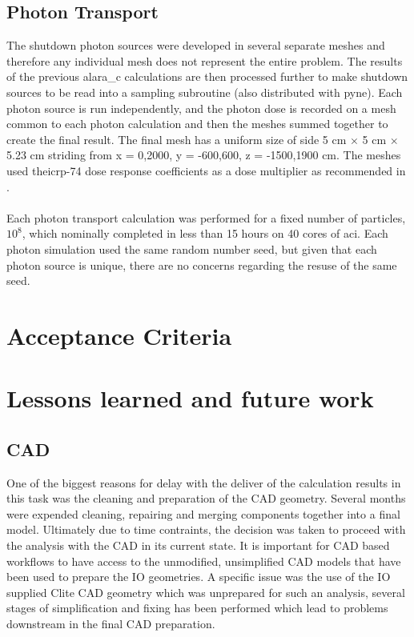 \documentclass[12pt]{article}
\begin{document}
\subsection{Photon Transport}
The shutdown photon sources were developed in several separate meshes and
therefore any individual mesh does not represent the entire problem. The
results of the previous \gls{alara_c} calculations are then processed further
to make shutdown sources to be read into a sampling subroutine (also distributed
with \gls{pyne}). Each photon source is run independently, and the photon dose
is recorded on a mesh common to each photon calculation and then the meshes
summed together to create the final result. The final mesh has a uniform size of
side 5 cm $\times$ 5 cm $\times$ 5.23 cm striding from x = {0,2000}, y = {-600,600},
 z = {-1500,1900} cm. The meshes used the\gls{icrp}-74 dose response coefficients 
as a dose multiplier as recommended in \cite{iter_sdr_coeffs}.
\\
\\
Each photon transport calculation was performed for a fixed number of particles,
$10^8$, which nominally completed in less than 15 hours on 40 cores of
\gls{aci}. Each photon simulation used the same random number seed, but given
that each photon source is unique, there are no concerns regarding the resuse
of the same seed.

\newpage
\clearpage
\section{Acceptance Criteria}

\newpage
\clearpage
\section{Lessons learned and future work}
\subsection*{CAD}
One of the biggest reasons for delay with the deliver of the calculation results
in this task was the cleaning and preparation of the CAD geometry. Several
months were expended cleaning, repairing and merging components together into a
final model. Ultimately due to time contraints, the decision was taken to
proceed with the analysis with the CAD in its current state. It is important
for CAD based workflows to have access to the unmodified, unsimplified CAD
models that have been used to prepare the IO geometries. A specific issue
was the use of the IO supplied Clite CAD geometry which was unprepared for
such an analysis, several stages of simplification and fixing has been performed
which lead to problems downstream in the final CAD preparation.
\end{document}
